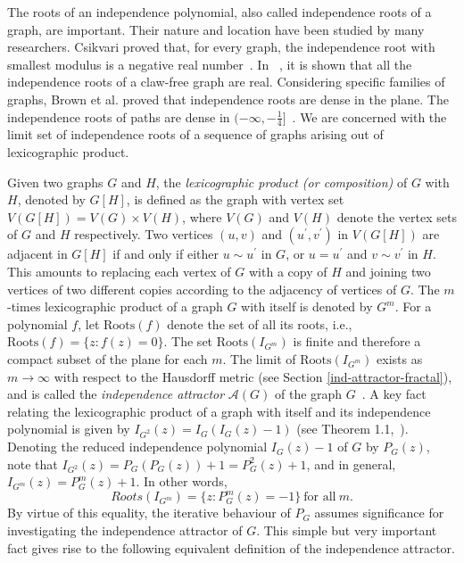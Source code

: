 \documentclass[12pt,a4paper]{article}
\theoremstyle{plain}
\numberwithin{equation}{section}
\begin{document}
\par The roots of an independence polynomial, also called independence roots of a graph, are important. Their nature and location have been studied by many researchers.  Csikvari proved that, for every graph, the independence root with smallest modulus is a negative real number~\cite{PC}. In ~\cite{CS}, it is shown that all the independence roots of a claw-free graph are real.  Considering specific families of graphs, Brown et al. proved that independence roots are dense in the plane. The  independence roots of paths are dense in $(-\infty, -\frac{1}{4}]$~\cite{brownetal2004}.  We are concerned with the limit set of independence roots of a sequence of graphs arising out of  lexicographic product. 
\par
Given two graphs $G$ and $H$, the {\em lexicographic product {\rm(}or composition{\rm )}} of $G$ with $H$, denoted by $G[H]$, is defined as the graph with vertex set $V(G[H])=V(G) \times V(H)$, where $V(G)$ and $ V(H)$ denote the vertex sets of $G$ and $H$ respectively. Two vertices $(u,v)$ and $(u^{\prime}, v^{\prime})$  in $V(G[H])$ are adjacent in $G[H]$ if and only if either $u\sim u^{\prime}$ in $ G$, or $u=u^{\prime}$ and $v\sim v^{\prime}$ in $H$. This amounts to replacing each vertex of $G$ with a copy of $H$ and joining two vertices of two different copies according to the adjacency of vertices of $G$.  The $m$-times lexicographic product of a graph $G$ with itself is denoted by $G^m$. 
For a polynomial $f$, let $\text{Roots}(f)$ denote the set of all its roots, i.e.,  $\text{Roots}(f)=\{z: f(z)=0\}$.
The set $ \text{Roots} (I_{G^m})$ is finite and therefore a compact subset of the plane for each $m$. The limit  of $ \text{Roots} (I_{G^m})$ exists as $m \to \infty$ with respect to the Hausdorff metric (see Section \ref{ind-attractor-fractal}), and is called the \textit{independence attractor}  $\mathcal{A}(G)$ of  the graph $G$~\cite{hickman2001}.
A key fact relating the lexicographic product of a graph with itself and its independence polynomial is given by  $I_{G^2}(z) =I_G (I_G (z)-1)$ (see Theorem 1.1,~\cite{brownetal2003}). Denoting the reduced independence polynomial $I_G (z)-1$ of $G$ by $P_G (z)$, note that  $I_{G^2}(z) =P_G (P_G (z))+1=P_G ^2 (z)+1$, and in general, $I_{G^m}(z) =P_G ^m (z)+1$. In other words,
\begin{equation}
	 Roots(I_{G^m})  =\{z: P_G^m (z)=-1\}~\mbox{for all}~ m.
\end{equation}   
By virtue of this equality, the iterative behaviour of $P_G$ assumes significance for investigating the independence attractor of $G $. This simple but very important fact  gives rise to the following equivalent definition of the independence attractor.
\end{document}
